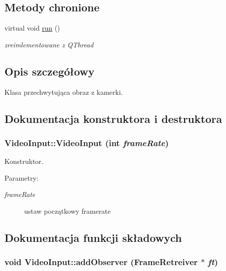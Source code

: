 \subsection*{Metody chronione}
\begin{CompactItemize}
\item 
virtual void \hyperlink{class_video_input_653a4568756629a94a3b6e2697973864}{run} ()
\begin{CompactList}\small\item\em zreimlementowane z QThread \item\end{CompactList}\end{CompactItemize}


\subsection{Opis szczegółowy}
Klasa przechwytująca obraz z kamerki. 

\subsection{Dokumentacja konstruktora i destruktora}
\hypertarget{class_video_input_136409a2c510d131dd25b00796ebb9a6}{
\subsubsection[{VideoInput}]{\setlength{\rightskip}{0pt plus 5cm}VideoInput::VideoInput (int {\em frameRate})}}
\label{class_video_input_136409a2c510d131dd25b00796ebb9a6}


Konstruktor. 

\begin{Desc}
\item[Parametry:]
\begin{description}
\item[{\em frameRate}]ustaw początkowy framerate \end{description}
\end{Desc}


\subsection{Dokumentacja funkcji składowych}
\hypertarget{class_video_input_c2370a0c1ea0d4b1ce36c2f9678530a4}{
\subsubsection[{addObserver}]{\setlength{\rightskip}{0pt plus 5cm}void VideoInput::addObserver ({\bf FrameRetreiver} $\ast$ {\em ft})}}
\label{class_video_input_c2370a0c1ea0d4b1ce36c2f9678530a4}


